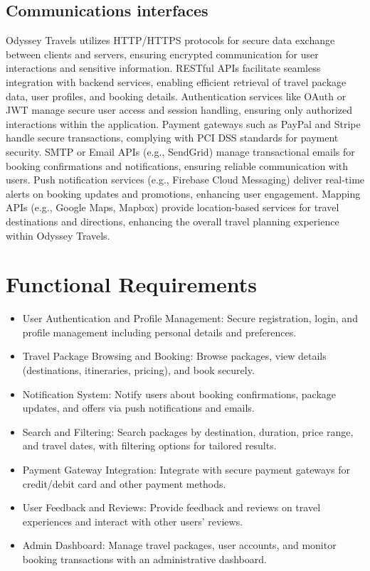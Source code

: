 \documentclass{scrreprt}
\begin{document}
\subsection{Communications interfaces}
Odyssey Travels utilizes HTTP/HTTPS protocols for secure data exchange between clients and servers, ensuring encrypted communication for user interactions and sensitive information. RESTful APIs facilitate seamless integration with backend services, enabling efficient retrieval of travel package data, user profiles, and booking details. Authentication services like OAuth or JWT manage secure user access and session handling, ensuring only authorized interactions within the application. Payment gateways such as PayPal and Stripe handle secure transactions, complying with PCI DSS standards for payment security. SMTP or Email APIs (e.g., SendGrid) manage transactional emails for booking confirmations and notifications, ensuring reliable communication with users. Push notification services (e.g., Firebase Cloud Messaging) deliver real-time alerts on booking updates and promotions, enhancing user engagement. Mapping APIs (e.g., Google Maps, Mapbox) provide location-based services for travel destinations and directions, enhancing the overall travel planning experience within Odyssey Travels.

\section {Functional Requirements}
\begin{itemize}
    \item User Authentication and Profile Management: Secure registration, login, and profile management including personal details and preferences.
    \item Travel Package Browsing and Booking: Browse packages, view details (destinations, itineraries, pricing), and book securely.
    \item Notification System: Notify users about booking confirmations, package updates, and offers via push notifications and emails.
    \item Search and Filtering: Search packages by destination, duration, price range, and travel dates, with filtering options for tailored results.
    \item Payment Gateway Integration: Integrate with secure payment gateways for credit/debit card and other payment methods.
    \item User Feedback and Reviews: Provide feedback and reviews on travel experiences and interact with other users' reviews.
    \item Admin Dashboard: Manage travel packages, user accounts, and monitor booking transactions with an administrative dashboard.
\end{itemize}
\end{document}
